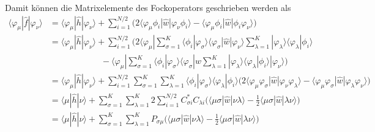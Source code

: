 \documentclass[9pt]{report}
\begin{document}
Damit können die Matrixelemente des Fockoperators geschrieben werden als
\begin{align}
\langle\varphi_{\mu}|\hat{f}|\varphi_{\nu}\rangle &= \langle\varphi_{\mu}|\hat{h}|\varphi_{\nu}\rangle +\sum_{i=1}^{N/2}\Big(2\langle\varphi_{\mu}\phi_i|\hat{w}|\varphi_{\nu}\phi_{i}\rangle-\langle\varphi_{\mu}\phi_{i}|\hat{w}|\phi_{i}\varphi_{\nu}\rangle\Big)\\
&=\langle\varphi_{\mu}|\hat{h}|\varphi_{\nu}\rangle +\sum_{i=1}^{N/2}\Big(2\langle\varphi_{\mu}|\sum_{\sigma=1}^{K}\langle\phi_{i}|\varphi_{\sigma}\rangle\langle\varphi_{\sigma}|\hat{w}|\varphi_{\nu}\rangle\sum_{\lambda=1}^{K}|\varphi_{\lambda}\rangle\langle\varphi_{\lambda}|\phi_{i}\rangle\\
&\qquad\qquad\qquad-\langle\varphi_{\mu}|\sum_{\sigma=1}^{K}\langle\phi_{i}|\varphi_{\sigma}\rangle\langle\varphi_{\sigma}|\hat{w}\sum_{\lambda=1}^{K}|\varphi_{\lambda}\rangle\langle\varphi_{\lambda}|\phi_{i}\rangle|\varphi_{\nu}\rangle\Big)\\
&= \langle\varphi_{\mu}|\hat{h}|\varphi_{\nu}\rangle +\sum_{i=1}^{N/2}\sum_{\sigma=1}^{K}\sum_{\lambda=1}^{K}\langle\phi_{i}|\varphi_{\sigma}\rangle\langle\varphi_{\lambda}|\phi_{i}\rangle\Big(2\langle\varphi_{\mu}\varphi_{\sigma}|\hat{w}|\varphi_{\nu}\varphi_{\lambda}\rangle - \langle\varphi_{\mu}\varphi_{\sigma}|\hat{w}|\varphi_{\lambda}\varphi_{\nu}\rangle\Big)\\
&= \langle\mu|\hat{h}|\nu\rangle +\sum_{\sigma=1}^{K}\sum_{\lambda=1}^{K}2\sum_{i=1}^{N/2}C_{\sigma i}^{*}C_{\lambda i}\Big(\langle\mu\sigma|\hat{w}|\nu\lambda\rangle -\frac{1}{2}\langle\mu\sigma|\hat{w}|\lambda\nu\rangle\Big)\\
&= \langle\mu|\hat{h}|\nu\rangle +\sum_{\sigma=1}^{K}\sum_{\lambda=1}^{K}P_{\sigma\mu}\Big(\langle\mu\sigma|\hat{w}|\nu\lambda\rangle -\frac{1}{2}\langle\mu\sigma|\hat{w}|\lambda\nu\rangle\Big)
\end{align}
\end{document}
